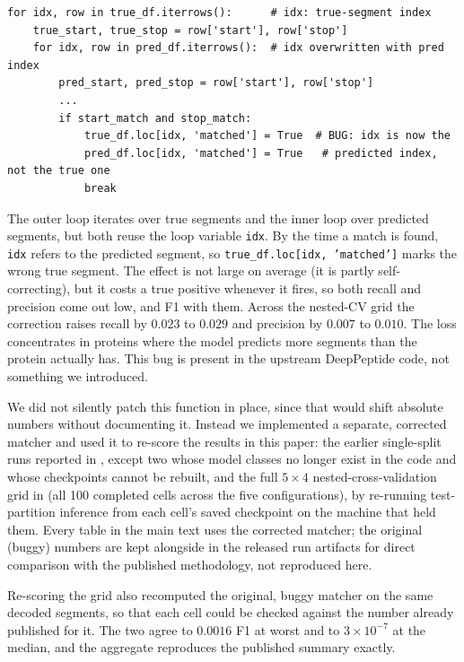 \documentclass{article}
\begin{document}
\begin{lstlisting}
for idx, row in true_df.iterrows():      # idx: true-segment index
    true_start, true_stop = row['start'], row['stop']
    for idx, row in pred_df.iterrows():  # idx overwritten with pred index
        pred_start, pred_stop = row['start'], row['stop']
        ...
        if start_match and stop_match:
            true_df.loc[idx, 'matched'] = True  # BUG: idx is now the
            pred_df.loc[idx, 'matched'] = True   # predicted index, not the true one
            break
\end{lstlisting}

The outer loop iterates over true segments and the inner loop over predicted segments, but both reuse the loop variable \texttt{idx}. By the time a match is found, \texttt{idx} refers to the predicted segment, so \texttt{true\_df.loc[idx, 'matched']} marks the wrong true segment. The effect is not large on average (it is partly self-correcting), but it costs a true positive whenever it fires, so both recall and precision come out low, and F1 with them. Across the nested-CV grid the correction raises recall by $0.023$ to $0.029$ and precision by $0.007$ to $0.010$. The loss concentrates in proteins where the model predicts more segments than the protein actually has. This bug is present in the upstream DeepPeptide code, not something we introduced.

We did not silently patch this function in place, since that would shift absolute numbers without documenting it. Instead we implemented a separate, corrected matcher and used it to re-score the results in this paper: the earlier single-split runs reported in , except two whose model classes no longer exist in the code and whose checkpoints cannot be rebuilt, and the full $5\times4$ nested-cross-validation grid in  (all 100 completed cells across the five configurations), by re-running test-partition inference from each cell's saved checkpoint on the machine that held them. Every table in the main text uses the corrected matcher; the original (buggy) numbers are kept alongside in the released run artifacts for direct comparison with the published methodology, not reproduced here.

Re-scoring the grid also recomputed the original, buggy matcher on the same decoded segments, so that each cell could be checked against the number already published for it. The two agree to $0.0016$ F1 at worst and to $3\times10^{-7}$ at the median, and the aggregate reproduces the published summary exactly.
\end{document}
